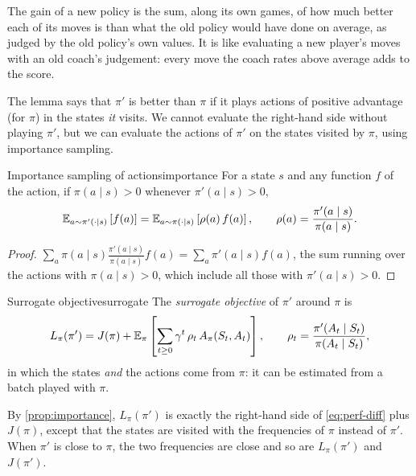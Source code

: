 \begin{intuition}
  The gain of a new policy is the sum, along its own games, of how much
  better each of its moves is than what the old policy would have done
  on average, as judged by the old policy's own values. It is like
  evaluating a new player's moves with an old coach's judgement: every
  move the coach rates above average adds to the score.
\end{intuition}

The lemma says that $\pi'$ is better than $\pi$ if it plays actions of
positive advantage (for $\pi$) in the states \emph{it} visits. We cannot
evaluate the right-hand side without playing $\pi'$, but we can evaluate
the actions of $\pi'$ on the states visited by $\pi$, using importance
sampling.

\begin{proposition}{Importance sampling of actions}{importance}
  For a state $s$ and any function $f$ of the action, if $\pi(a \mid s) > 0$
  whenever $\pi'(a \mid s) > 0$,
  \begin{equation}
    \mathbb{E}_{a \sim \pi'(\cdot \mid s)}\left[f(a)\right]
    = \mathbb{E}_{a \sim \pi(\cdot \mid s)}\left[\rho(a)\, f(a)\right], \qquad
    \rho(a) = \frac{\pi'(a \mid s)}{\pi(a \mid s)}.
  \end{equation}
\end{proposition}

\begin{proof}
  $\sum_a \pi(a \mid s) \frac{\pi'(a \mid s)}{\pi(a \mid s)} f(a) = \sum_a
  \pi'(a \mid s) f(a)$, the sum running over the actions with $\pi(a \mid
  s) > 0$, which include all those with $\pi'(a \mid s) > 0$.
\end{proof}

\begin{definition}{Surrogate objective}{surrogate}
  The \emph{surrogate objective} of $\pi'$ around $\pi$ is
  \begin{equation}
    \label{eq:surrogate}
    L_\pi(\pi') = J(\pi) + \mathbb{E}_{\pi}\left[ \sum_{t \geq 0} \gamma^t\,
    \rho_t\, A_\pi(S_t, A_t) \right], \qquad
    \rho_t = \frac{\pi'(A_t \mid S_t)}{\pi(A_t \mid S_t)},
  \end{equation}
  in which the states \emph{and} the actions come from $\pi$: it can be
  estimated from a batch played with $\pi$.
\end{definition}

By \cref{prop:importance}, $L_\pi(\pi')$ is exactly the right-hand side of
\eqref{eq:perf-diff} plus $J(\pi)$, except that the states are visited with
the frequencies of $\pi$ instead of $\pi'$. When $\pi'$ is close to $\pi$,
the two frequencies are close and so are $L_\pi(\pi')$ and $J(\pi')$.


